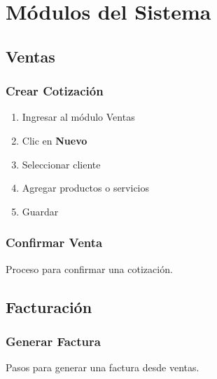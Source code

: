 \section{Módulos del Sistema}

\subsection{Ventas}
\subsubsection{Crear Cotización}
\begin{enumerate}
    \item Ingresar al módulo Ventas
    \item Clic en \textbf{Nuevo}
    \item Seleccionar cliente
    \item Agregar productos o servicios
    \item Guardar
\end{enumerate}

\subsubsection{Confirmar Venta}
Proceso para confirmar una cotización.

\subsection{Facturación}
\subsubsection{Generar Factura}
Pasos para generar una factura desde ventas.


